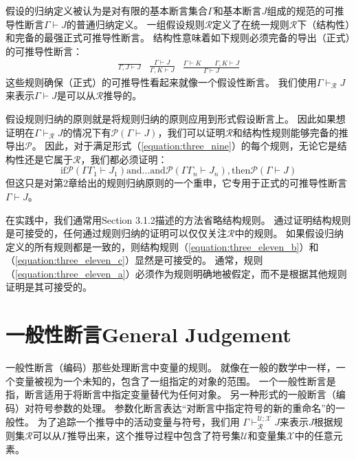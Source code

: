 假设的归纳定义被认为是对有限的基本断言集合$ \Gamma $和基本断言$ J $组成的规范的可推导性断言$ \Gamma \vdash J $的普通归纳定义。
一组假设规则$ \mathcal{R} $定义了在统一规则$ \mathcal{R} $下（结构性）和完备的最强正式可推导性断言。
结构性意味着如下规则必须完备的导出（正式）的可推导性断言：
\begin{subequations}
    \begin{align}
        \frac{}{\Gamma,J\vdash J} \label{equation:three_eleven_a}
    \end{align}
    \begin{align}
        \frac{\Gamma \vdash J}{\Gamma,K\vdash J} \label{equation:three_eleven_b}
    \end{align}
    \begin{align}
        \frac{\Gamma \vdash K \qquad \Gamma,K\vdash J}{\Gamma\vdash J} \label{equation:three_eleven_c}
    \end{align}
\end{subequations}
这些规则确保（正式）的可推导性看起来就像一个假设性断言。
我们使用$\Gamma \vdash_{\mathcal{R}} J$来表示$\Gamma \vdash J$是可以从$\mathcal{R}$推导的。

假设规则归纳的原则就是将规则归纳的原则应用到形式假设断言上。
因此如果想证明在$\Gamma \vdash_{\mathcal{R}} J$的情况下有$\mathcal{P}(\Gamma \vdash J)$，我们可以证明$\mathcal{R}$和结构性规则能够完备的推导出$\mathcal{P}$。
因此，对于满足形式（\ref{equation:three_nine}）的每个规则，无论它是结构性还是它属于$ \mathcal{R} $，我们都必须证明：
$$\text{if} \mathcal{P}(\Gamma \Gamma_1 \vdash J_1) \text{and} \dots \text{and} \mathcal{P}(\Gamma \Gamma_n \vdash J_n), \text{then} \mathcal{P}(\Gamma \vdash J)$$
但这只是对第2章给出的规则归纳原则的一个重申，它专用于正式的可推导性断言$ \Gamma \vdash J $。

在实践中，我们通常用Section 3.1.2描述的方法省略结构规则。
通过证明结构规则是可接受的，任何通过规则归纳的证明可以仅仅关注$ \mathcal{R} $中的规则。
如果假设归纳定义的所有规则都是一致的，则结构规则（\ref{equation:three_eleven_b}）和（\ref{equation:three_eleven_c}）显然是可接受的。
通常，规则（\ref{equation:three_eleven_a}）必须作为规则明确地被假定，而不是根据其他规则证明是其可接受的。

\section{一般性断言General Judgement}

一般性断言（编码）那些处理断言中变量的规则。
就像在一般的数学中一样，一个变量被视为一个未知的，包含了一组指定的对象的范围。
一个一般性断言是指，断言适用于将断言中指定变量替代为任何对象。
另一种形式的一般断言（编码）对符号参数的处理。
参数化断言表达“对断言中指定符号的新的重命名”的一般性。
为了追踪一个推导中的活动变量与符号，我们用  $\Gamma \vdash_{\mathcal{R}}^{\mathcal{U};\mathcal{X}} J $来表示$J$根据规则集$\mathcal{R}$可以从$\Gamma$推导出来，这个推导过程中包含了符号集$\mathcal{U}$和变量集$\mathcal{X}$中的任意元素。

